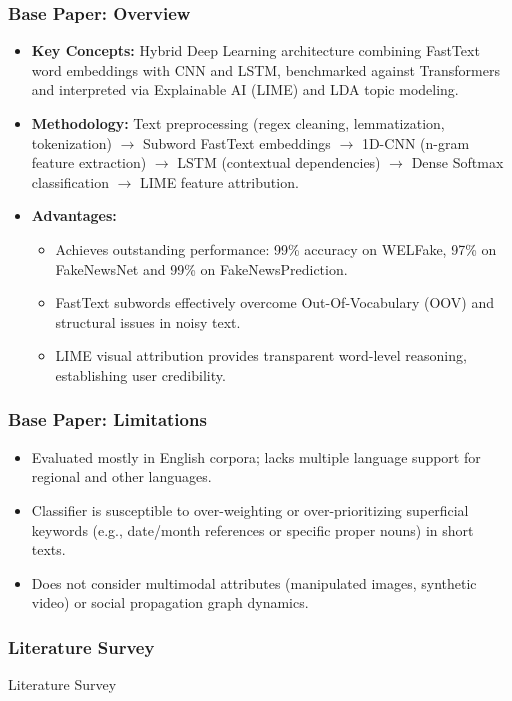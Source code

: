 \documentclass{beamer}
\begin{document}
\begin{frame}
\frametitle{Base Paper: Overview}
\small{
\begin{itemize}
    \item \textbf{Key Concepts:} Hybrid Deep Learning architecture combining FastText word embeddings with CNN and LSTM, benchmarked against Transformers and interpreted via Explainable AI (LIME) and LDA topic modeling.
    \item \textbf{Methodology:} Text preprocessing (regex cleaning, lemmatization, tokenization) $\rightarrow$ Subword FastText embeddings $\rightarrow$ 1D-CNN (n-gram feature extraction) $\rightarrow$ LSTM (contextual dependencies) $\rightarrow$ Dense Softmax classification $\rightarrow$ LIME feature attribution.
    \item \textbf{Advantages:}
    \begin{itemize}
        \item Achieves outstanding performance: 99\% accuracy on WELFake, 97\% on FakeNewsNet and 99\% on FakeNewsPrediction.
        \item FastText subwords effectively overcome Out-Of-Vocabulary (OOV) and structural issues in noisy text.
        \item LIME visual attribution provides transparent word-level reasoning, establishing user credibility.
    \end{itemize}
\end{itemize}
}
\end{frame}

\begin{frame}
\frametitle{Base Paper: Limitations}
\large{
\begin{itemize}
    \item Evaluated mostly in English corpora; lacks multiple language support for regional and other languages.
    \item Classifier is susceptible to over-weighting or over-prioritizing superficial keywords (e.g., date/month references or specific proper nouns) in short texts.
    \item Does not consider multimodal attributes (manipulated images, synthetic video) or social propagation graph dynamics.
\end{itemize}
}
\end{frame}

\begin{frame}
\frametitle{Literature Survey}
\fontsize{30pt}{36pt}\selectfont
\centerline{Literature Survey}
\end{frame}
\end{document}
